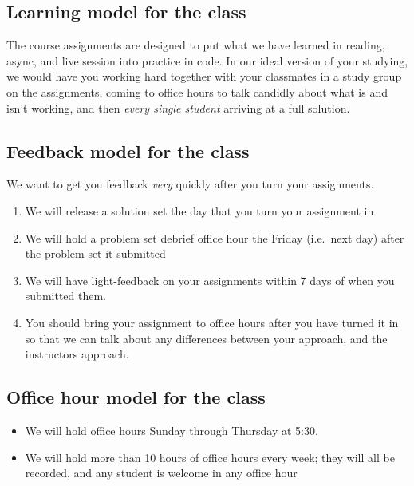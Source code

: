 \documentclass[
]{book}
\providecommand{\tightlist}{%
  \setlength{\itemsep}{0pt}\setlength{\parskip}{0pt}}
\begin{document}
\hypertarget{learning-model-for-the-class}{%
\subsection{Learning model for the
class}\label{learning-model-for-the-class}}

The course assignments are designed to put what we have learned in
reading, async, and live session into practice in code. In our ideal
version of your studying, we would have you working hard together with
your classmates in a study group on the assignments, coming to office
hours to talk candidly about what is and isn't working, and then
\emph{every single student} arriving at a full solution.

\hypertarget{feedback-model-for-the-class}{%
\subsection{Feedback model for the
class}\label{feedback-model-for-the-class}}

We want to get you feedback \emph{very} quickly after you turn your
assignments.

\begin{enumerate}
\def\labelenumi{\arabic{enumi}.}
\tightlist
\item
  We will release a solution set the day that you turn your assignment
  in
\item
  We will hold a problem set debrief office hour the Friday (i.e.~next
  day) after the problem set it submitted
\item
  We will have light-feedback on your assignments within 7 days of when
  you submitted them.
\item
  You should bring your assignment to office hours after you have turned
  it in so that we can talk about any differences between your approach,
  and the instructors approach.
\end{enumerate}

\hypertarget{office-hour-model-for-the-class}{%
\subsection{Office hour model for the
class}\label{office-hour-model-for-the-class}}

\begin{itemize}
\tightlist
\item
  We will hold office hours Sunday through Thursday at 5:30.
\item
  We will hold more than 10 hours of office hours every week; they will
  all be recorded, and any student is welcome in any office hour
\end{itemize}
\end{document}
